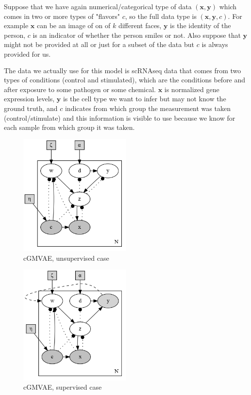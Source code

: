 \documentclass[11pt, a4paper]{report}
\theoremstyle{plain}
\theoremstyle{definition}
\theoremstyle{remark}
\newcommand{\x}{\mathbf{x}}
\newcommand{\y}{\mathbf{y}}
\begin{document}
Suppose that we have again numerical/categorical type of data $(\x, \y)$ which 
comes in two or more types of "flavors" $c$, so the full data type 
is $(\x, \y, c)$. For example $\x$ can be an image of on of $k$ 
different faces, 
$\y$ is the identity of the person, $c$ is an indicator of whether the person
smiles or not. 
Also suppose that $\y$ might not be provided at all or just for
a subset of the data but $c$ is always provided for us.

The data we actually use for this model is scRNAseq data that comes from two types 
of conditions (control and stimulated), 
which are the conditions before and after exposure to some pathogen or some chemical.
$\x$ is normalized gene expression levels, $\y$ is the cell type 
we want to infer but may not know the ground truth, and $c$ indicates from which
group the measurement was taken (control/stimulate) and this information is
visible to use because we know for each sample from which group it was
taken.


\begin{figure}[h]
\centering
\includegraphics[width=0.5\textwidth]{plots/dirichlet_gmm_cvae.gv.png}
\caption{cGMVAE, unsupervised case}
\label{fig:dirgmmcvae}
\end{figure}

\begin{figure}[h]
\centering
\includegraphics[width=0.5\textwidth]{plots/dirichlet_gmm_cvae_supervised.gv.png}
\caption{cGMVAE, supervised case}
\label{fig:dirgmmcvae_super}
\end{figure}
\end{document}
